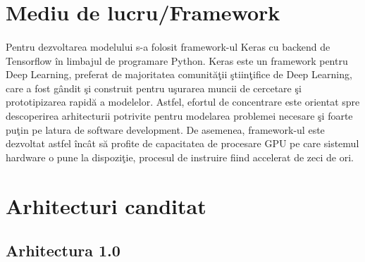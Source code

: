 \section{Mediu de lucru/Framework}

\paragraph{}
Pentru dezvoltarea modelului s-a folosit framework-ul Keras \cite{chollet2015keras} cu backend de Tensorflow \cite{DBLP:journals/corr/AbadiABBCCCDDDG16} \^ in limbajul de programare Python. Keras este un framework pentru Deep Learning, preferat de majoritatea comunit\u a\c tii \c stiin\c tifice de Deep Learning, care a fost g\^ andit \c si construit pentru u\c surarea muncii de cercetare \c si prototipizarea rapid\u a a modelelor. Astfel, efortul de concentrare este orientat spre descoperirea arhitecturii potrivite pentru modelarea problemei necesare \c si foarte pu\c tin pe latura de software development. De asemenea, framework-ul este dezvoltat astfel \^ inc\^ at s\u a profite de capacitatea de procesare GPU pe care sistemul hardware o pune la dispozi\c tie, procesul de instruire fiind accelerat de zeci de ori.

\section{Arhitecturi canditat}

\subsection{Arhitectura 1.0}

